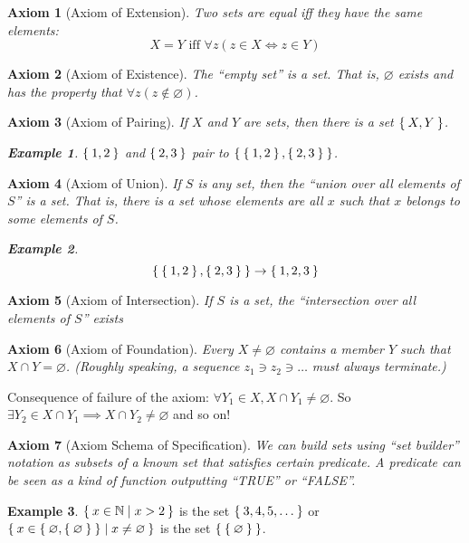 \documentclass[12pt]{amsart}
\newcommand{\bbN}{\mathbb{N}}
\theoremstyle{plain}
\newtheorem {AXM}{Axiom}
\theoremstyle{remark}
\theoremstyle{definition}
\newtheorem*{eg}{Example}
\begin{document}
\begin{AXM}[Axiom of Extension]
	Two sets are equal iff they have the same elements:
\begin{equation*}
	X = Y \mbox{ iff } \forall z(z\in X \iff z\in Y) 
\end{equation*}
\end{AXM}

\begin{AXM}[Axiom of Existence]
	The ``empty set'' is a set. That is, $\varnothing$ exists and has the property that $\forall z(z \notin \varnothing)$.
\end{AXM}

\begin{AXM}[Axiom of Pairing]
	If $X$ and $Y$ are sets, then there is a set $\Set{X, Y}$.
	\begin{eg}
		$\Set{1, 2}$ and $\Set{2, 3}$ pair to $\Set{\Set{1,2}, \Set{2,3}}$.
	\end{eg}
\end{AXM}

\begin{AXM}[Axiom of Union]
	If $S$ is any set, then the ``union over all elements of $S$'' is a set. That is, there is a set whose elements are all $x$ such that $x$ belongs to some elements of $S$.
	\begin{eg}
	\begin{equation*}
		\Set{\Set{1,2},\Set{2,3}} \rightarrow \Set{1,2,3}
	\end{equation*}
	\end{eg}
\end{AXM}

\begin{AXM}[Axiom of Intersection]
	If $S$ is a set, the ``intersection over all elements of $S$'' exists
\end{AXM}

\begin{AXM}[Axiom of Foundation]
	Every $X \neq \varnothing$ contains a member $Y$ such that $X \cap Y = \varnothing$.
	(Roughly speaking, a sequence $z_1 \ni z_2 \ni \dots$ must always terminate.)
\end{AXM}
Consequence of failure of the axiom:
\newline
$\forall Y_1 \in X, X \cap Y_1 \neq \varnothing$. So $\exists Y_2\in X \cap Y_1 \implies X \cap Y_2 \neq \varnothing$ and so on!

\begin{AXM}[Axiom Schema of Specification]
	We can build sets using ``set builder'' notation as subsets of a known set that satisfies certain predicate. A predicate can be seen as a kind of function outputting ``TRUE'' or ``FALSE''.
\end{AXM}
\begin{eg}
	$\Set{x \in \bbN| x > 2}$ is the set $\Set{3,4,5,\dots}$ or $\Set{x \in \Set{\varnothing, \Set{\varnothing}}| x \neq \varnothing}$ is the set $\Set{\Set{\varnothing}}$.
\end{eg}
\end{document}
